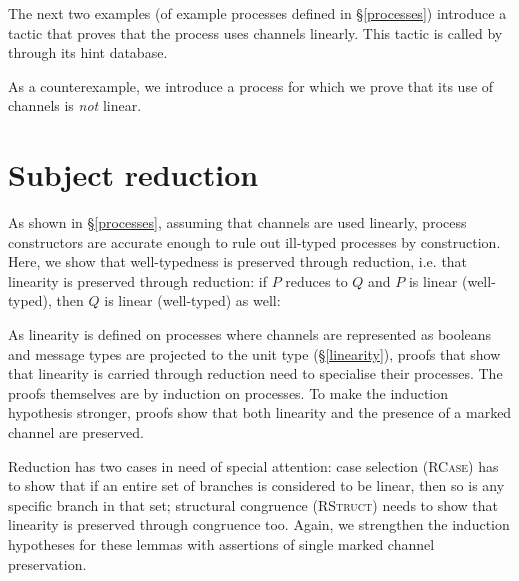 \documentclass{mproj}
\begin{document}
The next two examples (of example processes defined in \S \ref{processes}) introduce a tactic that proves that the process uses channels linearly. This tactic is called by  through its hint database.


As a counterexample, we introduce a process for which we prove that its use of channels is \emph{not} linear.


\section{Subject reduction}\label{subject-reduction}

As shown in \S \ref{processes}, assuming that channels are used linearly, process constructors are accurate enough to rule out ill-typed processes by construction. Here, we show that well-typedness is preserved through reduction, i.e. that linearity is preserved through reduction: if $P$ reduces to $Q$ and $P$ is linear (well-typed), then $Q$ is linear (well-typed) as well:



As linearity is defined on processes where channels are represented as booleans and message types are projected to the unit type (\S \ref{linearity}), proofs that show that linearity is carried through reduction need to specialise their processes. The proofs themselves are by induction on processes. To make the induction hypothesis stronger, proofs show that both linearity and the presence of a marked channel are preserved.


Reduction has two cases in need of special attention: case selection (\textsc{RCase}) has to show that if an entire set of branches is considered to be linear, then so is any specific branch in that set; structural congruence (\textsc{RStruct}) needs to show that linearity is preserved through congruence too. Again, we strengthen the induction hypotheses for these lemmas with assertions of single marked channel preservation.


\end{document}
